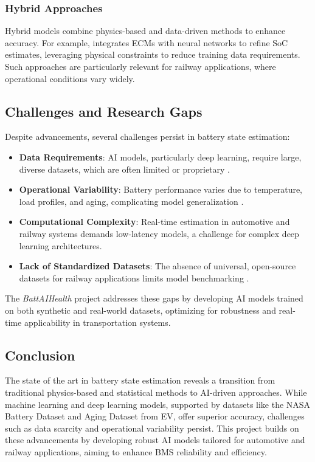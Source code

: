 \subsubsection{Hybrid Approaches}
Hybrid models combine physics-based and data-driven methods to enhance accuracy. For example, \cite{Ref5} integrates ECMs with neural networks to refine SoC estimates, leveraging physical constraints to reduce training data requirements. Such approaches are particularly relevant for railway applications, where operational conditions vary widely.


\subsection{Challenges and Research Gaps}
Despite advancements, several challenges persist in battery state estimation:
\begin{itemize}
    \item \textbf{Data Requirements}: AI models, particularly deep learning, require large, diverse datasets, which are often limited or proprietary \cite{Ref5}.
    \item \textbf{Operational Variability}: Battery performance varies due to temperature, load profiles, and aging, complicating model generalization \cite{Report}.
    \item \textbf{Computational Complexity}: Real-time estimation in automotive and railway systems demands low-latency models, a challenge for complex deep learning architectures.
    \item \textbf{Lack of Standardized Datasets}: The absence of universal, open-source datasets for railway applications limits model benchmarking \cite{Ref3}.
\end{itemize}
The \textit{BattAIHealth} project addresses these gaps by developing AI models trained on both synthetic and real-world datasets, optimizing for robustness and real-time applicability in transportation systems.

\subsection{Conclusion}
The state of the art in battery state estimation reveals a transition from traditional physics-based and statistical methods to AI-driven approaches. While machine learning and deep learning models, supported by datasets like the NASA Battery Dataset and Aging Dataset from EV, offer superior accuracy, challenges such as data scarcity and operational variability persist. This project builds on these advancements by developing robust AI models tailored for automotive and railway applications, aiming to enhance BMS reliability and efficiency.